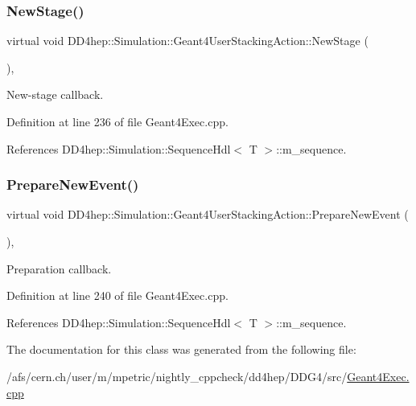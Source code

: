 \subsubsection{\texorpdfstring{New\+Stage()}{NewStage()}}
{\footnotesize\ttfamily virtual void D\+D4hep\+::\+Simulation\+::\+Geant4\+User\+Stacking\+Action\+::\+New\+Stage (\begin{DoxyParamCaption}{ }\end{DoxyParamCaption})\hspace{0.3cm}{\ttfamily [inline]}, {\ttfamily [virtual]}}



New-\/stage callback. 



Definition at line 236 of file Geant4\+Exec.\+cpp.



References D\+D4hep\+::\+Simulation\+::\+Sequence\+Hdl$<$ T $>$\+::m\+\_\+sequence.

\hypertarget{class_d_d4hep_1_1_simulation_1_1_geant4_user_stacking_action_a565c100df77dc0bdfe343a424285cdab}{}\label{class_d_d4hep_1_1_simulation_1_1_geant4_user_stacking_action_a565c100df77dc0bdfe343a424285cdab} 
\subsubsection{\texorpdfstring{Prepare\+New\+Event()}{PrepareNewEvent()}}
{\footnotesize\ttfamily virtual void D\+D4hep\+::\+Simulation\+::\+Geant4\+User\+Stacking\+Action\+::\+Prepare\+New\+Event (\begin{DoxyParamCaption}{ }\end{DoxyParamCaption})\hspace{0.3cm}{\ttfamily [inline]}, {\ttfamily [virtual]}}



Preparation callback. 



Definition at line 240 of file Geant4\+Exec.\+cpp.



References D\+D4hep\+::\+Simulation\+::\+Sequence\+Hdl$<$ T $>$\+::m\+\_\+sequence.



The documentation for this class was generated from the following file\+:\begin{DoxyCompactItemize}
\item 
/afs/cern.\+ch/user/m/mpetric/nightly\+\_\+cppcheck/dd4hep/\+D\+D\+G4/src/\hyperlink{_geant4_exec_8cpp}{Geant4\+Exec.\+cpp}\end{DoxyCompactItemize}
